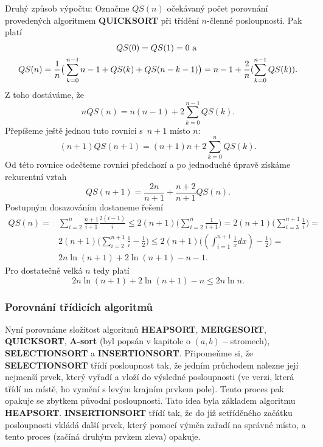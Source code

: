 \documentclass[a4paper,12pt]{article}
\begin{document}
Druhý způsob výpočtu:\newline 
Označme $QS(n)$ očekávaný počet 
porovnání provedených algoritmem {\bf QUICKSORT} při 
třídění $n$-členné posloupnosti. Pak platí
\begin{gather*} QS(0)=QS(1)=0\text{\rm\ a }\\
QS(n)=\frac 1n\big(\sum_{k=0}^{n-1}n-1+QS(k)+QS(n-k-1)\big)=n-1+\frac 
2n(\sum_{k=0}^{n-1}QS(k)).\end{gather*}
Z toho dostáváme, že 
$$nQS(n)=n(n-1)+2\sum_{k=0}^{n-1}QS(k).$$
Přepíšeme ještě jednou tuto rovnici s~$n+1$ místo $
n$:
$$(n+1)QS(n+1)=(n+1)n+2\sum_{k=0}^nQS(k).$$
Od této rovnice odečteme rovnici předchozí a po 
jednoduché úpravě získáme rekurentní vztah
$$QS(n+1)=\frac {2n}{n+1}+\frac {n+2}{n+1}QS(n).$$
Postupným dosazováním dostaneme řešení 
\begin{align*} QS(n)=&\sum_{i=2}^n\frac {n+1}{i+1}\frac {2(i-1)}i\le 2(
n+1)\big(\sum_{i=2}^n\frac 1{i+1}\big)=2(n+1)\big(\sum_{i=3}^{n+1}\frac 
1i\big)=\\
&2(n+1)\big(\sum_{i=2}^{n+1}\frac 1i-\frac 12\big)\le 2(n+1)\big(
(\int_{i=1}^{n+1}\frac 1xdx)-\frac 12\big)=\\
&2n\ln(n+1)+2\ln(n+1)-n-1.\end{align*}
Pro dostatečně velká $n$ tedy platí 
$$2n\ln(n+1)+2\ln(n+1)-n\le 2n\ln n.$$

\subsubsection{Porovnání třídicích algoritmů}

Nyní porovnáme složitost algoritmů 
{\bf HEAPSORT}, {\bf MERGE\-SORT}, {\bf QUICKSORT}, {\bf A-sort} (byl popsán 
v kapitole o $(a,b)-$stromech), 
{\bf SELECTIONSORT} a {\bf INSERTIONSORT}.  Připomeňme si, že 
{\bf SELECTIONSORT} tří\-dí posloupnost tak, že jedním
průcho\-dem nalezne její nej\-menší prvek, 
který vyřadí a vloží do výsledné 
posloupnosti (ve verzi, která třídí na místě, ho vymění 
s levým krajním prvkem pole). 
Tento proces pak opakuje se zbytkem 
původní posloupnosti. Tato idea byla 
zákla\-dem algoritmu {\bf HEAPSORT}.  {\bf INSERTIONSORT} třídí 
tak, že do již setříděného začátku  
posloupnosti vkládá další prvek, který pomocí výměn 
zařadí na správné místo, a tento proces (začíná druhým 
prvkem zleva) opakuje.  
\end{document}
